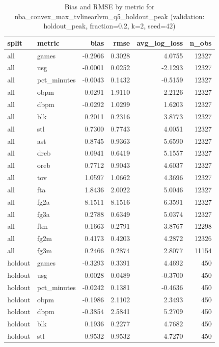 \begin{table}
\caption{Bias and RMSE by metric for nba_convex_max_tvlinearlvm_q5_holdout_peak (validation: holdout_peak, fraction=0.2, k=2, seed=42)}
\label{tab:nba_convex_max_tvlinearlvm_q5_holdout_peak_vs_holdout_peak_f20_k2_s42_bias_rmse}
\begin{tabular}{llrrrr}
\toprule
split & metric & bias & rmse & avg\_log\_loss & n\_obs \\
\midrule
all & games & -0.2966 & 0.3028 & 4.0755 & 12327 \\
all & usg & -0.0001 & 0.0252 & -2.1293 & 12327 \\
all & pct\_minutes & -0.0043 & 0.1432 & -0.5159 & 12327 \\
all & obpm & 0.0291 & 1.9110 & 2.2126 & 12327 \\
all & dbpm & -0.0292 & 1.0299 & 1.6203 & 12327 \\
all & blk & 0.2011 & 0.2316 & 3.8773 & 12327 \\
all & stl & 0.7300 & 0.7743 & 4.0051 & 12327 \\
all & ast & 0.8745 & 0.9363 & 5.6590 & 12327 \\
all & dreb & 0.0941 & 0.6419 & 5.1557 & 12327 \\
all & oreb & 0.7712 & 0.9043 & 4.6037 & 12327 \\
all & tov & 1.0597 & 1.0662 & 4.3696 & 12327 \\
all & fta & 1.8436 & 2.0022 & 5.0046 & 12327 \\
all & fg2a & 8.1511 & 8.1516 & 6.3591 & 12327 \\
all & fg3a & 0.2788 & 0.6349 & 5.0374 & 12327 \\
all & ftm & -0.1663 & 0.2791 & 3.8767 & 12298 \\
all & fg2m & 0.4173 & 0.4203 & 4.2872 & 12326 \\
all & fg3m & 0.2466 & 0.2874 & 2.8077 & 11154 \\
holdout & games & -0.3293 & 0.3391 & 4.4692 & 450 \\
holdout & usg & 0.0028 & 0.0489 & -0.3700 & 450 \\
holdout & pct\_minutes & -0.0242 & 0.1381 & -0.4636 & 450 \\
holdout & obpm & -0.1986 & 2.1102 & 2.3493 & 450 \\
holdout & dbpm & -0.3854 & 2.5841 & 5.2709 & 450 \\
holdout & blk & 0.1936 & 0.2277 & 4.7682 & 450 \\
holdout & stl & 0.9532 & 0.9532 & 4.7270 & 450 \\

\end{tabular}
\end{table}
